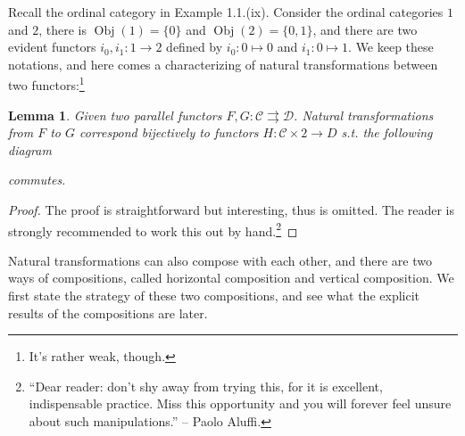 \documentclass{article}
\newtheorem{lemma}[theorem]{Lemma}
\theoremstyle{definition}
\theoremstyle{definition}
\theoremstyle{remark}
\DeclareMathOperator{\Obj}{Obj}
\begin{document}
	Recall the ordinal category in Example 1.1.(ix). Consider the ordinal categories $\mathrm{1}$ and $\mathrm{2}$, there is $\Obj(\mathrm{1})=\{0\}$ and $\Obj(\mathrm{2})=\{0,1\}$, and there are two evident functors $i_0,i_1:\mathrm{1}\to\mathrm{2}$ defined by $i_0:0\mapsto 0$ and $i_1:0\mapsto 1$. We keep these notations, and here comes a characterizing of natural transformations between two functors:\footnote{It's rather weak, though.}
	\begin{lemma}
	Given two parallel functors $F,G:\mathcal{C}\rightrightarrows \mathcal{D}$. Natural transformations from $F$ to $G$ correspond bijectively to functors $H:\mathcal{C}\times \mathrm{2}\to D$ s.t. the following diagram
	\begin{center}
		\end{center}
		commutes.
	\end{lemma}
	\begin{proof}
	The proof is straightforward but interesting, thus is omitted. The reader is strongly recommended to work this out by hand.\footnote{``Dear reader: don't shy away from trying this, for it is excellent, indispensable practice. Miss this opportunity and you will forever feel unsure about such manipulations.'' -- Paolo Aluffi.}
	\end{proof}
	Natural transformations can also compose with each other, and there are two ways of compositions, called horizontal composition and vertical composition. We first state the strategy of these two compositions, and see what the explicit results of the compositions are later.
\end{document}
